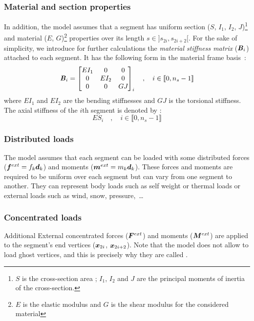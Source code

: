 \subsubsection{Material and section properties}
In addition, the model assumes that a segment has uniform section ($S$, $I_1$, $I_2$, $J$)\footnote{$S$ is the cross-section area ; $I_1$, $I_2$ and $J$ are the principal moments of inertia of the cross-section.} and material ($E$, $G$)\footnote{$E$ is the elastic modulus and $G$ is the shear  modulus for the considered material} properties over its length $s \in ]s_{2i},s_{2i+2}[$. For the sake of simplicity, we introduce for further calculations the \emph{material stiffness matrix} ($\boldsymbol{\mathit{B}}_i$) attached to each segment. It has the following form in the material frame basis~:
\begin{equation}
	\boldsymbol{\mathit{B}}_i = \begin{bmatrix} 
			EI_1		&	0		&	0		\\
			0		&	EI_{2}	&	0		\\
			0		&	0		&	GJ_{}	\\
		\end{bmatrix}_i
	\quad , \quad i \in \llbracket 0, n_s-1 \rrbracket
	\label{eq:stiffnessmatrix}
\end{equation}
where $EI_1$ and $EI_2$ are the bending stiffnesses and $GJ$ is the torsional stiffness. The axial stiffness of the $i$th segment is denoted by :
\begin{equation}
	ES_i 	\quad , \quad i \in \llbracket 0, n_s-1 \rrbracket
\end{equation}

\subsubsection{Distributed loads}
The model assumes that each segment can be loaded with some distributed forces ($\boldsymbol{f}^{ext} = f_k\boldsymbol{d}_k$) and moments ($\boldsymbol{m}^{ext} = m_k\boldsymbol{d}_k$). These forces and moments are required to be uniform over each segment but can vary from one segment to another. They can represent body loads such as self weight or thermal loads or external loads such as wind, snow, pressure,~\dots

\subsubsection{Concentrated loads}
Additional External concentrated forces ($\boldsymbol{F}^{ext}$) and moments ($\boldsymbol{M}^{ext}$) are applied to the segment's end vertices ($\boldsymbol{x}_{2i}$,  $\boldsymbol{x}_{2i+2}$). Note that the model does not allow to load ghost vertices, and this is precisely why they are called .

